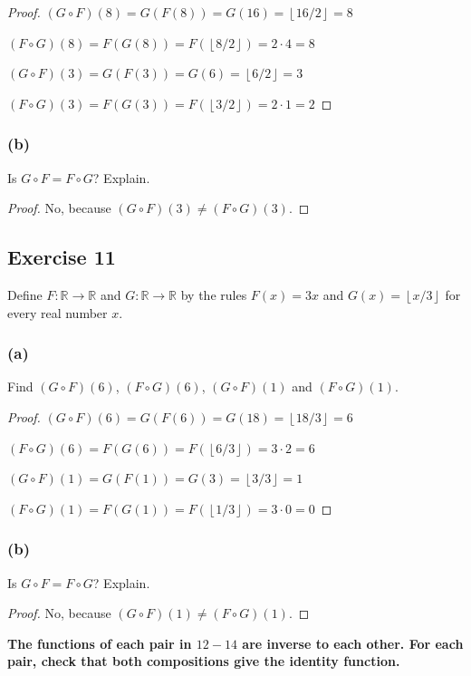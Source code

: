 \documentclass[14pt]{extarticle}
\newcommand{\R}{\mathbb{R}}
\newcommand{\cy}{\color{cyan}}
\newcommand{\floor}[1]{{\left\lfloor#1\right\rfloor}}
\begin{document}
\begin{proof}
\((G \circ F)(8) = G(F(8)) = G(16) = \floor{16/2} = 8\)

\((F \circ G)(8) = F(G(8)) = F(\floor{8/2}) = 2 \cdot 4 = 8\)

\((G \circ F)(3) = G(F(3)) = G(6) = \floor{6/2} = 3\)

\((F \circ G)(3) = F(G(3)) = F(\floor{3/2}) = 2 \cdot 1 = 2\)
\end{proof}

\subsubsection{(b)}
Is \(G \circ F = F \circ G\)? Explain.

\begin{proof}
No, because \((G \circ F)(3) \neq (F \circ G)(3)\).
\end{proof}

\subsection{Exercise 11}
Define \(F: \R \to \R\) and \(G: \R \to \R\) by the rules 
\(F(x) = 3x\) and \(G(x) = \floor{x/3}\) for every real number $x$.

\subsubsection{(a)}
Find \((G \circ F)(6)\), \((F \circ G)(6)\), \((G \circ F)(1)\) and \((F \circ G)(1)\).

\begin{proof}
\((G \circ F)(6) = G(F(6)) = G(18) = \floor{18/3} = 6\)

\((F \circ G)(6) = F(G(6)) = F(\floor{6/3}) = 3 \cdot 2 = 6\)

\((G \circ F)(1) = G(F(1)) = G(3) = \floor{3/3} = 1\)

\((F \circ G)(1) = F(G(1)) = F(\floor{1/3}) = 3 \cdot 0 = 0\)
\end{proof}

\subsubsection{(b)}
Is \(G \circ F = F \circ G\)? Explain.

\begin{proof}
No, because \((G \circ F)(1) \neq (F \circ G)(1)\).
\end{proof}

{\bf \cy The functions of each pair in $12-14$ are inverse to each other. For each pair, check that both compositions 
give the identity function.}
\end{document}
